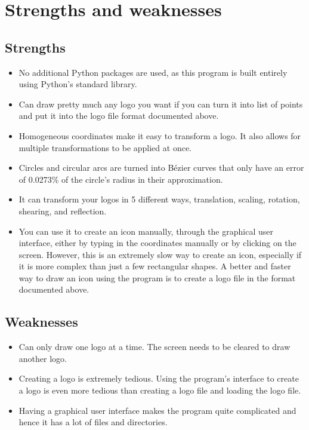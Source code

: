 \documentclass[11pt]{article}
\begin{document}
 \newpage

\section{Strengths and weaknesses}
\label{sec:orga19d61d}

\subsection{Strengths}
\label{sec:org9440a6f}
\begin{itemize}
\item No additional Python packages are used, as this program is built entirely using Python's standard library.
\item Can draw pretty much any logo you want if you can turn it into list of points and put it into the logo file format documented above.
\item Homogeneous coordinates make it easy to transform a logo. It also allows for multiple transformations to be applied at once.
\item Circles and circular arcs are turned into Bézier curves that only have an error of 0.0273\% of the circle's radius in their approximation.
\item It can transform your logos in 5 different ways, translation, scaling, rotation, shearing, and reflection.
\item You can use it to create an icon manually, through the graphical user interface, either by typing in the coordinates manually or by clicking on the screen. However, this is an extremely slow way to create an icon, especially if it is more complex than just a few rectangular shapes. A better and faster way to draw an icon using the program is to create a logo file in the format documented above.
\end{itemize}

\subsection{Weaknesses}
\label{sec:org7bb56bd}
\begin{itemize}
\item Can only draw one logo at a time. The screen needs to be cleared to draw another logo.
\item Creating a logo is extremely tedious. Using the program's interface to create a logo is even more tedious than creating a logo file and loading the logo file.
\item Having a graphical user interface makes the program quite complicated and hence it has a lot of files and directories.
\end{itemize}
\end{document}

